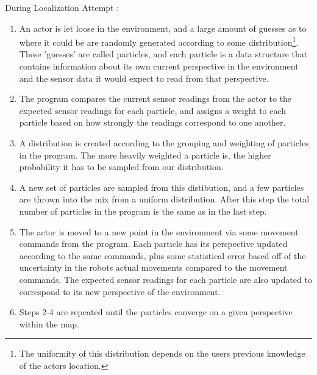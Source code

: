 \documentclass[a4paper,11pt]{article}
\begin{document}
  During Localization Attempt :
  
  \begin{enumerate}
  \item An actor is let loose in the environment, and a large amount of guesses as to where it could be are randomly generated according to some distribution\footnote{The uniformity of this distribution depends on the users previous knowledge of the actors location.}. These 'guesses' are called particles, and each particle is a data structure that contains information about its own current perspective in the environment and the sensor data it would expect to read from that perspective.
  \item The program compares the current sensor readings from the actor to the expected sensor readings for each particle, and assigns a weight to each particle based on how strongly the readings correspond to one another.
  \item A distribution is created according to the grouping and weighting of particles in the program. The more heavily weighted a particle is, the higher probability it has to be sampled from our distribution.
  \item A new set of particles are sampled from this distibution, and a few particles are thrown into the mix from a uniform distribution. After this step the total number of particles in the program is the same as in the last step.
  \item The actor is moved to a new point in the environment via some movement commands from the program. Each particle has its perspective updated according to the same commands, plus some statistical error based off of the uncertainty in the robots actual movements compared to the movement commands. The expected sensor readings for each particle are also updated to correspond to its new perspective of the environment.
  \item Steps 2-4 are repeated until the particles converge on a given perspective within the map. 
  \end{enumerate} 
  
  \newpage




\end{document}
